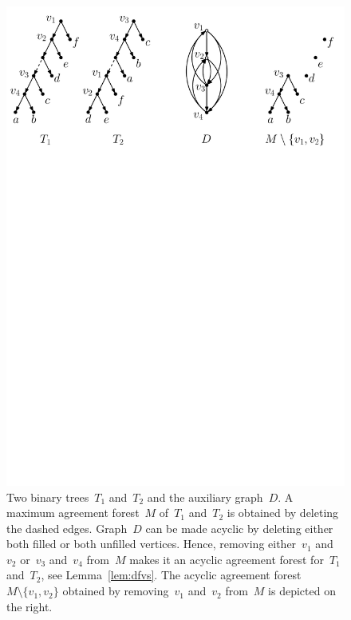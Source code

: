 \begin{figure}
  \centerline{\includegraphics[scale=.6]{../figs/fig_example2}}
  \caption{{Two binary trees~$T_1$ and~$T_2$ and the auxiliary graph~$D$. A maximum agreement forest~$M$ of~$T_1$ and~$T_2$ is obtained by deleting the dashed edges. Graph~$D$ can be made acyclic by deleting either both filled or both unfilled vertices. Hence, removing either~$v_1$ and~$v_2$ or~$v_3$ and~$v_4$ from~$M$ makes it an acyclic agreement forest for~$T_1$ and~$T_2$, see Lemma~\ref{lem:dfvs}. The acyclic agreement forest~$M\setminus\{v_1,v_2\}$ obtained by removing~$v_1$ and~$v_2$ from~$M$ is depicted on the right.}}
  \label{fig:example}
\end{figure}


